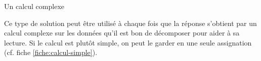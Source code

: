 \begin{Fiche}{Un calcul complexe}

	Ce type de solution peut être utilisé à chaque fois
	que la réponse s'obtient par un calcul complexe sur les données
	qu'il est bon de décomposer pour aider à sa lecture.
	Si le calcul est plutôt simple, 
	on peut le garder en une seule assignation
	(cf. fiche \vref{fiche:calcul-simple}).
	
\end{Fiche}
